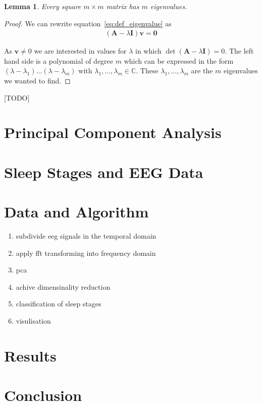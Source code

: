 \documentclass[a4paper]{IEEEtran}
\newtheorem{lemma}{Lemma}
\begin{document}
\begin{lemma}
	Every square $m\times m$ matrix has $m$ eigenvalues.
\end{lemma}

\begin{proof}
	We can rewrite equation~\ref{eq:def_eigenvalue} as
	\begin{align*}
		(\mathbf{A} - \lambda \mathbf{I})\mathbf{v} = \mathbf{0}
	\end{align*}
	
	As $\mathbf{v} \neq 0$ we are interested in values for $\lambda$ in which $\det(\mathbf{A} - \lambda \mathbf{I}) = 0$. The left hand side is a polynomial of degree $m$ which can be expressed in the form $(\lambda - \lambda_1)...(\lambda - \lambda_m)$ with $\lambda_1, ..., \lambda_m \in \mathbb{C}$. These $\lambda_1, ..., \lambda_m$ are the $m$ eigenvalues we wanted to find.
	
\end{proof}

[TODO]

\section{Principal Component Analysis}
\label{sec:principal_component_analysis}

\section{Sleep Stages and EEG Data}
\label{sec:sleep_stages_and_eeg_data}

\section{Data and Algorithm}
\label{sec:data_and_algorithm}

\begin{enumerate}
	\item subdivide eeg signals in the temporal domain
	\item apply fft transforming into frequency domain
	\item pca
	\item achive dimensinality reduction
	\item classification of sleep stages
	\item visulisation
\end{enumerate}

\section{Results}
\label{sec:results}

\section{Conclusion}
\label{sec:conclusion}



\end{document}

